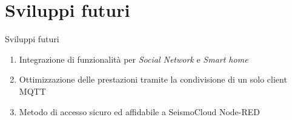 \section{Sviluppi futuri}

\begin{frame}[c]{Sviluppi futuri}

\begin{enumerate}
	\item Integrazione di funzionalità per \textit{Social Network} e \textit{Smart home}
	\item Ottimizzazione delle prestazioni tramite la condivisione di un solo client MQTT
	\item Metodo di accesso sicuro ed affidabile a SeismoCloud Node-RED
\end{enumerate}

\end{frame}

